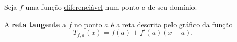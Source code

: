 \begin{definition}
	Seja $f$ uma função \href{con_der_em_pt_moodle.html}{diferenciável} num ponto $a$ de seu domínio.
	
	A \textbf{reta tangente} a $f$ no ponto $a$ é a reta descrita pelo gráfico da função
	\[T_{f,a}(x)=f(a)+f'(a)(x-a).\]
\end{definition}